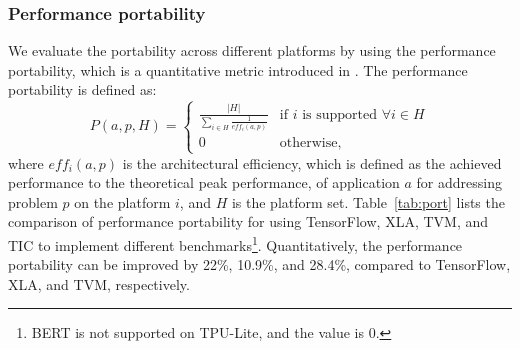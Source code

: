 \subsubsection{Performance portability}

We evaluate the portability across different platforms by using the performance portability, which is a quantitative metric introduced in \cite{pennycook2019implications}. The performance portability is defined as:
\begin{equation*}
P(a,p,H) =
\begin{cases}
\frac{|H|}{\sum_{i \in H}{\frac{1}{eff_{i}(a,p)}}} & \text{if $i$ is supported $\forall i \in H$}\\
0& \text{otherwise},
\end{cases}
\end{equation*}
where $eff_{i}(a,p)$ is the architectural efficiency, which is defined as the achieved performance to the theoretical peak performance, of application $a$ for addressing problem $p$ on the platform $i$, and $H$ is the platform set. Table~\ref{tab:port} lists the comparison of performance portability for using TensorFlow, XLA, TVM, and TIC to implement different benchmarks\footnote{BERT is not supported on TPU-Lite, and the value is 0.}. Quantitatively, the performance portability can be improved by 22\%, 10.9\%, and 28.4\%, compared to TensorFlow, XLA, and TVM, respectively.






